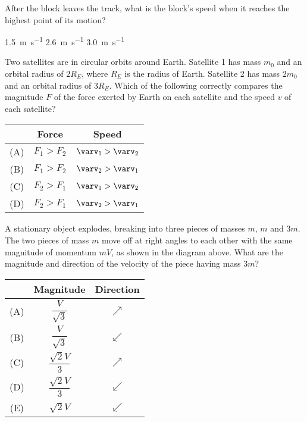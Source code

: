 \documentclass[12pt]{exam}
\begin{document}
\begin{questions}
  \question After the block leaves the track, what is the block's speed when it
  reaches the highest point of its motion?
  \begin{choices}
    \hspace{.3in}
    \choice\SI{1.5}{\metre\per\second}\hspace{.3in} 
    \choice\SI{2.6}{\metre\per\second}\hspace{.3in}
    \choice\SI{3.0}{\metre\per\second}
  \end{choices}
  \label{last}
  
  \question Two satellites are in circular orbits around Earth. Satellite 1 has
  mass $m_0$ and an orbital radius of $2R_E$, where $R_E$ is the radius of
  Earth. Satellite 2 has mass $2m_0$ and an orbital radius of $3R_E$. Which of
  the following correctly compares the magnitude $F$ of the force exerted by
  Earth on each satellite and the speed $v$ of each satellite?

  \begin{tabular}{ccc}
    & Force & Speed\\ \hline
    (A) & $F_1>F_2$ & $\varv_1>\varv_2$ \\
    (B) & $F_1>F_2$ & $\varv_2>\varv_1$ \\
    (C) & $F_2>F_1$ & $\varv_1>\varv_2$ \\
    (D) & $F_2>F_1$ & $\varv_2>\varv_1$
  \end{tabular}

  \newpage
  \question A stationary object explodes, breaking into three pieces of masses
  $m$, $m$ and $3m$. The two pieces of mass $m$ move off at right angles to each
  other with the same magnitude of momentum $mV$, as shown in the diagram
  above. What are the magnitude and direction of the velocity of the piece
  having mass $3m$?
  \label{last-mcq}
  \begin{tabular}{ccc}
    & Magnitude & Direction \\
    \hline
    (A) & $\dfrac V{\sqrt3}$  & {\Huge $\nearrow$} \\
    (B) & $\dfrac V{\sqrt3}$  & {\Huge $\swarrow$} \\
    (C) & $\dfrac{\sqrt2V}3$ & {\Huge $\nearrow$} \\
    (D) & $\dfrac{\sqrt2V}3$ & {\Huge $\swarrow$} \\
    (E) & $\sqrt2V$ & {\Huge $\swarrow$}
  \end{tabular}
  \newpage
  

\end{questions}
\end{document}
